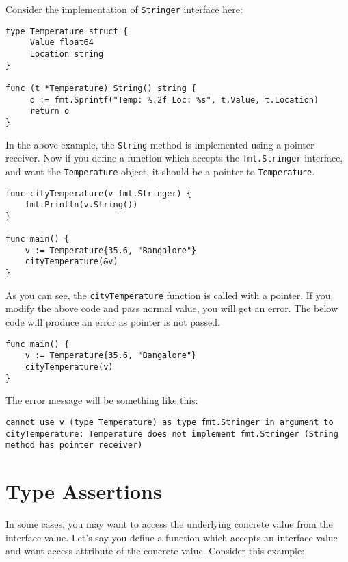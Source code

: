 Consider the implementation of \texttt{Stringer} interface here:

\begin{lstlisting}[numbers=none]
type Temperature struct {
     Value float64
     Location string
}

func (t *Temperature) String() string {
     o := fmt.Sprintf("Temp: %.2f Loc: %s", t.Value, t.Location)
     return o
}
\end{lstlisting}

In the above example, the \texttt{String} method is implemented using
a pointer receiver.  Now if you define a function which accepts the
\texttt{fmt.Stringer} interface, and want the \texttt{Temperature}
object, it should be a pointer to \texttt{Temperature}.

\begin{lstlisting}[numbers=none]
func cityTemperature(v fmt.Stringer) {
    fmt.Println(v.String())
}

func main() {
    v := Temperature{35.6, "Bangalore"}
    cityTemperature(&v)
}
\end{lstlisting}

As you can see, the \texttt{cityTemperature} function is called with a
pointer.  If you modify the above code and pass normal value, you will
get an error.  The below code will produce an error as pointer is not
passed.

\begin{lstlisting}[numbers=none]
func main() {
    v := Temperature{35.6, "Bangalore"}
    cityTemperature(v)
}
\end{lstlisting}

The error message will be something like this:

\begin{lstlisting}[numbers=none]
cannot use v (type Temperature) as type fmt.Stringer in argument to
cityTemperature: Temperature does not implement fmt.Stringer (String
method has pointer receiver)
\end{lstlisting}

\section{Type Assertions}

In some cases, you may want to access the underlying concrete value
from the interface value.  Let's say you define a function which
accepts an interface value and want access attribute of the concrete
value.  Consider this example:

